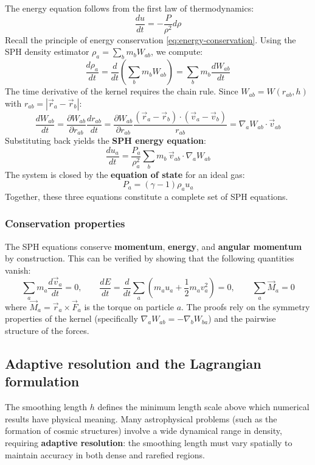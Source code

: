 The energy equation follows from the first law of thermodynamics:
$$
\dfrac{du}{dt} = - \dfrac{P}{\rho^2} d\rho
$$
Recall the principle of energy conservation \eqref{eq:energy-conservation}. Using the SPH density estimator $\rho_a = \sum_b m_b W_{ab}$, we compute:
$$
\dfrac{d\rho_a}{dt} = \dfrac{d}{dt} \left( \sum_b m_b W_{ab} \right) = \sum_b m_b \dfrac{dW_{ab}}{dt}
$$
The time derivative of the kernel requires the chain rule. Since $W_{ab} = W(r_{ab}, h)$ with $r_{ab} = |\vec{r}_a - \vec{r}_b|$:
$$
\dfrac{dW_{ab}}{dt} = \dfrac{\partial W_{ab}}{\partial r_{ab}} \dfrac{dr_{ab}}{dt}
= \dfrac{\partial W_{ab}}{\partial r_{ab}} \dfrac{(\vec{r}_a - \vec{r}_b) \cdot (\vec{v}_a - \vec{v}_b)}{r_{ab}}
= \nabla_a W_{ab} \cdot \vec{v}_{ab}
$$
Substituting back yields the \textbf{SPH energy equation}:
$$
\boxed{
\dfrac{du_a}{dt} = \dfrac{P_a}{\rho_a^2} \sum_b m_b \, \vec{v}_{ab} \cdot \nabla_a W_{ab}
}
$$
The system is closed by the \textbf{equation of state} for an ideal gas:
$$
\boxed{
P_a = (\gamma - 1) \rho_a u_a
}
$$
Together, these three equations constitute a complete set of SPH equations.

\subsubsection{Conservation properties}

The SPH equations conserve \textbf{momentum}, \textbf{energy}, and \textbf{angular momentum} by construction. This can be verified by showing that the following quantities vanish:
$$
\sum_a m_a \dfrac{d\vec{v}_a}{dt} = 0, \qquad
\dfrac{dE}{dt} = \dfrac{d}{dt} \sum_a \left( m_a u_a + \dfrac{1}{2} m_a v_a^2 \right) = 0, \qquad
\sum_a \vec{M}_a = 0
$$
where $\vec{M}_a = \vec{r}_a \times \vec{F}_a$ is the torque on particle $a$. The proofs rely on the symmetry properties of the kernel (specifically $\nabla_a W_{ab} = -\nabla_b W_{ba}$) and the pairwise structure of the forces.

\subsection{Adaptive resolution and the Lagrangian formulation}

The smoothing length $h$ defines the minimum length scale above which numerical results have physical meaning. Many astrophysical problems (such as the formation of cosmic structures) involve a wide dynamical range in density, requiring \textbf{adaptive resolution}: the smoothing length must vary spatially to maintain accuracy in both dense and rarefied regions.

